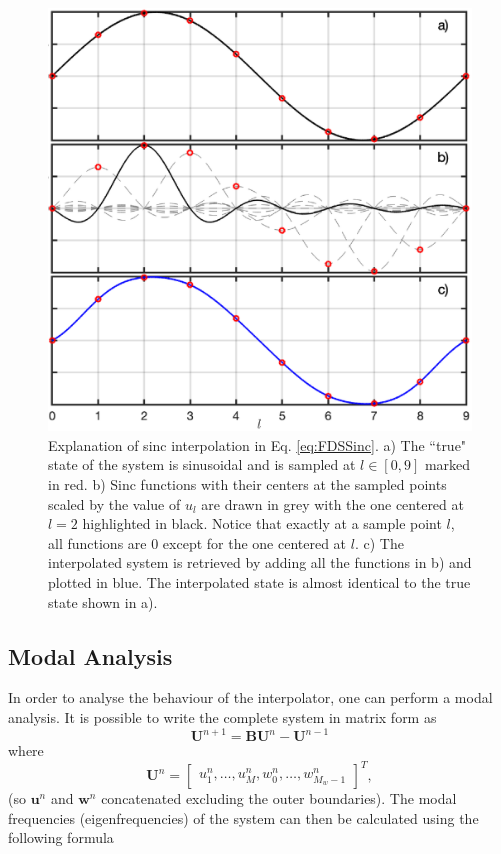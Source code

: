 \documentclass[dvipsnames]{article}
\begin{document}
\begin{figure}[h]
\centerline{\includegraphics[width=0.6\columnwidth]{sincExplanation.eps} }
\caption{\label{fig:sincExp}{Explanation of sinc interpolation in Eq. \eqref{eq:FDSSinc}. a) The ``true" state of the system is sinusoidal and is sampled at $l \in [0, 9]$ marked in red. b) Sinc functions with their centers at the sampled points scaled by the value of $u_l$ are drawn in grey with the one centered at $l = 2$ highlighted in black. Notice that exactly at a sample point $l$, all functions are 0 except for the one centered at $l$. c) The interpolated system is retrieved by adding all the functions in b) and plotted in blue. The interpolated state is almost identical to the true state shown in a).}}
\end{figure}



\subsection{Modal Analysis}\label{sec:modal}
In order to analyse the behaviour of the interpolator, one can perform a modal analysis. It is possible to write the complete system in matrix form as
\begin{equation}
    \mathbf{U}^{n+1} = \mathbf{B}\mathbf{U}^n - \mathbf{U}^{n-1}
\end{equation}
where \begin{equation}
\mathbf{U}^n = \begin{bmatrix}
u^n_1, \hdots, u^n_M, w_0^n, \hdots, w_{M_w-1}  ^n
\end{bmatrix}^T,
\end{equation}
(so $\mathbf{u}^n$ and $\mathbf{w}^n$ concatenated excluding the outer boundaries).  The modal frequencies (eigenfrequencies) of the system can then be calculated using the following formula \cite[p. 174]{Bilbao2009}
\end{document}
